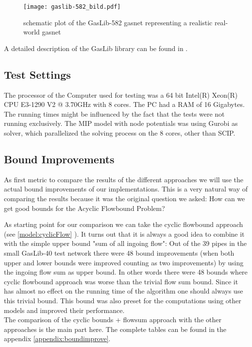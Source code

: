 \begin{figure}[h!, scale = 0.6]
  \centering
  \texttt{[image: gaslib-582\_bild.pdf]}
  \caption{schematic plot of the GasLib-582 gasnet representing a realistic real-world gasnet}
  \label{bild:gaslib582}
\end{figure}

A detailed description of the GasLib library can be found in 
\cite{HumpolaJoormannOucherifPfetschScheweSchmidtSchwarz:2015}.\\

\subsection{Test Settings}
The processor of the Computer used for testing was a 64 bit Intel(R) Xeon(R) CPU E3-1290 V2 @ 3.70GHz with 8 cores. The 
PC had a RAM of 16 Gigabytes. The running times might be influenced by the fact that the tests were not running 
exclusively. The MIP model with node potentials was using Gurobi as solver, which parallelized the solving process on 
the 8 cores, other than SCIP. 


\subsection{Bound Improvements}
As first metric to compare the results of the different approaches we will use the actual bound improvements of our 
implementations. This is a very natural way of comparing the results because it was the original question we asked: How 
can we get good bounds for the Acyclic Flowbound Problem? 

As starting point for our comparison we can take the cyclic flowbound approach (see \ref{model:cyclicFlow} ). It turns 
out that it is always a good idea to combine it with the simple upper bound "sum of all ingoing flow": Out of the 39 
pipes in the small GasLib-40 test network there were 48 bound improvements (when both upper and lower bounds were 
improved counting as two improvements) by using the ingoing flow sum as upper bound. In other words there were 48 
bounds where cyclic flowbound approach was worse than the trivial flow sum bound. 
Since it has almost no effect on the running time of the algorithm one should always use this trivial bound. This 
bound was also preset for the computations using other models and improved their performance.\\

The comparison of the cyclic bounds + flowsum approach with the other approaches is the main part here. The complete 
tables can be found in the appendix \ref{appendix:boundimprove}. 

